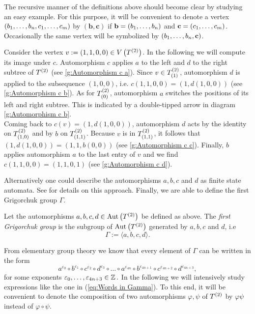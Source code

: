 The recursive manner of the definitions above should become clear by studying an easy example. For this purpose, it will be convenient to denote a vertex $(\seq{b},\seq[m]{c})$ by $(\mathbf{b},\mathbf{c})$ if $\mathbf{b}=(\seq{b})$ and $\mathbf{c}=(\seq[m]{c})$. Occasionally the same vertex will be symbolized by $(\seq{b},\mathbf{c})$.
\begin{exam}
Consider the vertex $v:=(1,1,0,0)\in\VT$. In the following we will compute its image under $c$. Automorphism $c$ applies $a$ to the left and $d$ to the right subtree of $\T$ (see \cref{g:Automorphism c a}). Since $v\in\ST{(1)}$, automorphism $d$ is applied to the subsequence $(1,0,0)$, i.e. $c(1,1,0,0)=(1,d(1,0,0))$ (see \cref{g:Automorphism c b}). As for $\ST{(0)}$, automorphism $a$ switches the positions of its left and right subtree. This is indicated by a double-tipped arrow in diagram \ref{g:Automorphism c b}.\\
Coming back to $c(v)=(1,d(1,0,0))$, automorphism $d$ acts by the identity on $\ST{(1,0)}$ and by $b$ on $\ST{(1,1)}$. Because $v$ is in $\ST{(1,1)}$, it follows that $(1,d(1,0,0))=(1,1,b(0,0))$ (see \cref{g:Automorphism c c}). Finally, $b$ applies automorphism $a$ to the last entry of $v$ and we find $c(1,1,0,0)=(1,1,0,1)$ (see \cref{g:Automorphism c d}).
\end{exam}

Alternatively one could describe the automorphisms $a,b,c$ and $d$ as finite state automata. See \cite{de2000topics} for details on this approach. Finally, we are able to define the first Grigorchuk group $\Gamma$.
\begin{defin}
Let the automorphisms $a,b,c,d\in\AutT$ be defined as above. The \emph{first Grigorchuk group} is the subgroup of $\AutT$ generated by $a,b,c$ and $d$, i.e
\begin{equation*}
\Gamma:=\langle a,b,c,d\rangle.
\end{equation*}
\end{defin}

From elementary group theory we know that every element of $\Gamma$ can be written in the form
\begin{equation}\label{eq:Words in Gamma}
a^{\varepsilon_0}\circ b^{\varepsilon_1}\circ c^{\varepsilon_2}\circ d^{\varepsilon_3}\circ\ldots\circ a^{\varepsilon_{4n}}\circ b^{\varepsilon_{4n+1}}\circ c^{\varepsilon_{4n+2}}\circ d^{\varepsilon_{4n+3}},
\end{equation}
for some exponents $\varepsilon_0,\ldots,\varepsilon_{4n+3}\in\Z.$ In the following we will intensively study expressions like the one in (\ref{eq:Words in Gamma}). To this end, it will be convenient to denote the composition of two automorphisms $\varphi,\psi$ of $\T$ by $\varphi\psi$ instead of $\varphi\circ\psi.$

